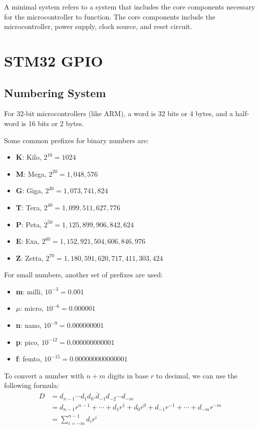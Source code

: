 \documentclass[a4paper,12pt]{article}
\begin{document}
A minimal system refers to a system that includes the core components necessary for the microcontroller to function. The core components include the microcontroller, power supply, clock source, and reset circuit.

\section{STM32 GPIO}

\subsection{Numbering System}

For 32-bit microcontrollers (like ARM), a word is 32 bits or 4 bytes, and a half-word is 16 bits or 2 bytes.

Some common prefixes for binary numbers are:
\begin{itemize}
	\item \textbf{K}: Kilo, $2^{10} = 1024$
	\item \textbf{M}: Mega, $2^{20} = 1,048,576$
	\item \textbf{G}: Giga, $2^{30} = 1,073,741,824$
	\item \textbf{T}: Tera, $2^{40} = 1,099,511,627,776$
	\item \textbf{P}: Peta, $2^{50} = 1,125,899,906,842,624$
	\item \textbf{E}: Exa, $2^{60} = 1,152,921,504,606,846,976$
	\item \textbf{Z}: Zetta, $2^{70} = 1,180,591,620,717,411,303,424$
\end{itemize}

For small numbers, another set of prefixes are used:
\begin{itemize}
	\item \textbf{m}: milli, $10^{-3} = 0.001$
	\item \textbf{$\mu$}: micro, $10^{-6} = 0.000001$
	\item \textbf{n}: nano, $10^{-9} = 0.000000001$
	\item \textbf{p}: pico, $10^{-12} = 0.000000000001$
	\item \textbf{f}: femto, $10^{-15} = 0.000000000000001$
\end{itemize}

To convert a number with $n + m$ digits in base $r$ to decimal, we can use the following formula:
\begin{align*}
	D &= \overline{d_{n-1} \cdots d_1 d_0. d_{-1} d_{-2} \cdots d_{-m}} \\
	&= d_{n-1} r^{n-1} + \cdots + d_1 r^1 + d_0 r^0 + d_{-1} r^{-1} + \cdots + d_{-m} r^{-m} \\
	&= \sum_{i=-m}^{n-1} d_i r^i
\end{align*}
\end{document}
